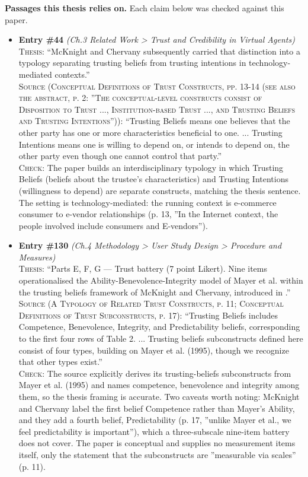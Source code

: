 \documentclass[11pt, a4paper]{article}
\begin{document}
\textbf{Passages this thesis relies on.} Each claim below was checked against this paper.
\begin{itemize}[leftmargin=1.2em,itemsep=4pt]
\item \textbf{Entry \#44} \textit{(Ch.3 Related Work > Trust and Credibility in Virtual Agents)}\\
\textsc{Thesis:} ``McKnight and Chervany subsequently carried that distinction into a typology separating trusting beliefs from trusting intentions in technology-mediated contexts.''\\
\textsc{Source (Conceptual Definitions of Trust Constructs, pp. 13-14 (see also the abstract, p. 2: ”The conceptual-level constructs consist of Disposition to Trust ..., Institution-based Trust ..., and Trusting Beliefs and Trusting Intentions”)):} ``Trusting Beliefs means one believes that the other party has one or more characteristics beneficial to one. ... Trusting Intentions means one is willing to depend on, or intends to depend on, the other party even though one cannot control that party.''\\
\textsc{Check:} The paper builds an interdisciplinary typology in which Trusting Beliefs (beliefs about the trustee's characteristics) and Trusting Intentions (willingness to depend) are separate constructs, matching the thesis sentence. The setting is technology-mediated: the running context is e-commerce consumer to e-vendor relationships (p. 13, ”In the Internet context, the people involved include consumers and E-vendors”).
\item \textbf{Entry \#130} \textit{(Ch.4 Methodology > User Study Design > Procedure and Measures)}\\
\textsc{Thesis:} ``Parts E, F, G — Trust battery (7 point Likert). Nine items operationalised the Ability-Benevolence-Integrity model of Mayer et al. within the trusting beliefs framework of McKnight and Chervany, introduced in .''\\
\textsc{Source (A Typology of Related Trust Constructs, p. 11; Conceptual Definitions of Trust Subconstructs, p. 17):} ``Trusting Beliefs includes Competence, Benevolence, Integrity, and Predictability beliefs, corresponding to the first four rows of Table 2. ... Trusting beliefs subconstructs defined here consist of four types, building on Mayer et al. (1995), though we recognize that other types exist.''\\
\textsc{Check:} The source explicitly derives its trusting-beliefs subconstructs from Mayer et al. (1995) and names competence, benevolence and integrity among them, so the thesis framing is accurate. Two caveats worth noting: McKnight and Chervany label the first belief Competence rather than Mayer's Ability, and they add a fourth belief, Predictability (p. 17, ”unlike Mayer et al., we feel predictability is important”), which a three-subscale nine-item battery does not cover. The paper is conceptual and supplies no measurement items itself, only the statement that the subconstructs are ”measurable via scales” (p. 11).
\end{itemize}
\end{document}
